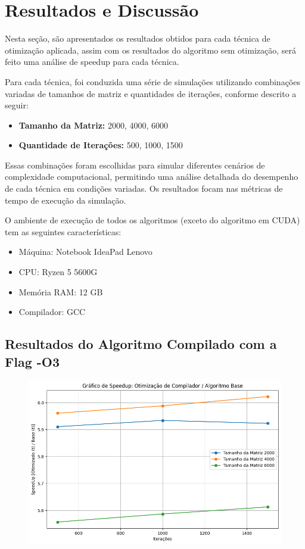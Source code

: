 \pagebreak

\section{Resultados e Discussão}

Nesta seção, são apresentados os resultados obtidos para cada técnica de otimização aplicada, assim com os resultados do algoritmo sem otimização, será feito uma análise de speedup para cada técnica.

Para cada técnica, foi conduzida uma série de simulações utilizando combinações variadas de tamanhos de matriz e quantidades de iterações, conforme descrito a seguir:

\begin{itemize}
    \item \textbf{Tamanho da Matriz:} 2000, 4000, 6000
    \item \textbf{Quantidade de Iterações:} 500, 1000, 1500
\end{itemize}

Essas combinações foram escolhidas para simular diferentes cenários de complexidade computacional, permitindo uma análise detalhada do desempenho de cada técnica em condições variadas. Os resultados focam nas métricas de tempo de execução da simulação.

O ambiente de execução de todos os algoritmos (exceto do algoritmo em CUDA) tem as seguintes características:

\begin{itemize}
    \item Máquina: Notebook IdeaPad Lenovo
    \item CPU: Ryzen 5 5600G
    \item Memória RAM: 12 GB
    \item Compilador: GCC
\end{itemize}
\subsection{Resultados do Algoritmo Compilado com a Flag -O3}

\begin{figure}[H]
    \centering
    \includegraphics[width=1\linewidth]{../assets/O3 - SpeedUp.png}
\end{figure}

